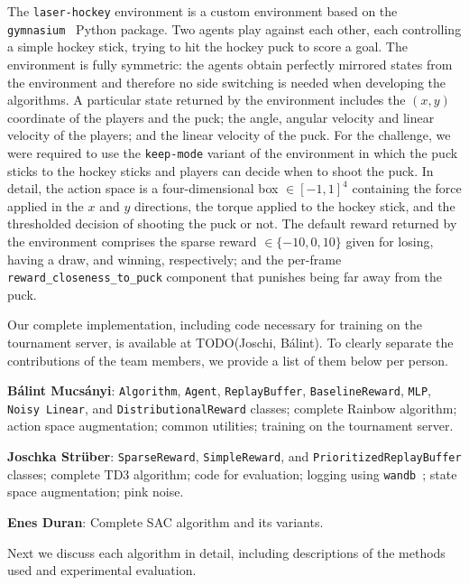 \documentclass[11pt]{article}
\begin{document}
The \texttt{laser-hockey} environment is a custom environment based on the \texttt{gymnasium}~\cite{towers_gymnasium_2023} Python package. Two agents play against each other, each controlling a simple hockey stick, trying to hit the hockey puck to score a goal. The environment is fully symmetric: the agents obtain perfectly mirrored states from the environment and therefore no side switching is needed when developing the algorithms. A particular state returned by the environment includes the $(x, y)$ coordinate of the players and the puck; the angle, angular velocity and linear velocity of the players; and the linear velocity of the puck. For the challenge, we were required to use the \texttt{keep-mode} variant of the environment in which the puck sticks to the hockey sticks and players can decide when to shoot the puck. In detail, the action space is a four-dimensional box $\in [-1, 1]^4$ containing the force applied in the $x$ and $y$ directions, the torque applied to the hockey stick, and the thresholded decision of shooting the puck or not. The default reward returned by the environment comprises the sparse reward $\in \{-10, 0, 10\}$ given for losing, having a draw, and winning, respectively; and the per-frame \texttt{reward\_closeness\_to\_puck} component that punishes being far away from the puck.

Our complete implementation, including code necessary for training on the tournament server, is available at TODO(Joschi, Bálint). To clearly separate the contributions of the team members, we provide a list of them below per person.

\medskip

\textbf{Bálint Mucsányi}: \texttt{Algorithm}, \texttt{Agent}, \texttt{ReplayBuffer}, \texttt{BaselineReward}, \texttt{MLP}, \texttt{Noisy Linear}, and \texttt{DistributionalReward} classes; complete Rainbow algorithm; action space augmentation; common utilities; training on the tournament server.

\medskip

\textbf{Joschka Strüber}: \texttt{SparseReward}, \texttt{SimpleReward}, and \texttt{PrioritizedReplayBuffer} classes; complete TD3 algorithm; code for evaluation; logging using \texttt{wandb}~\cite{wandb}; state space augmentation; pink noise.

\medskip

\textbf{Enes Duran}: Complete SAC algorithm and its variants.

\medskip

Next we discuss each algorithm in detail, including descriptions of the methods used and experimental evaluation.
\end{document}

